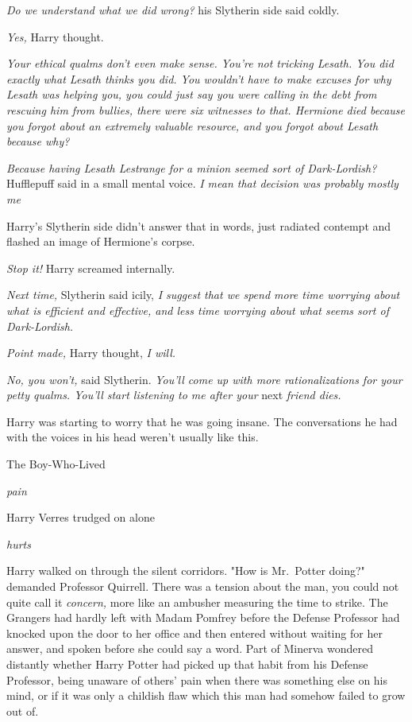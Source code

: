 \emph{Do we understand what we did wrong?} his Slytherin side said coldly.

\emph{Yes,} Harry thought.

\emph{Your ethical qualms don't even make sense. You're not tricking Lesath.
You did exactly what Lesath thinks you did. You wouldn't have to make excuses
for why Lesath was helping you, you could just say you were calling in the debt
from rescuing him from bullies, there were six witnesses to that. Hermione died
because you forgot about an extremely valuable resource, and you forgot about
Lesath because{\el} why?}

\emph{Because having Lesath Lestrange for a minion seemed sort of
Dark-Lordish?} Hufflepuff said in a small mental voice. \emph{I mean{\el}
that decision was probably mostly me{\el}}

Harry's Slytherin side didn't answer that in words, just radiated contempt and
flashed an image of Hermione's corpse.

\emph{Stop it!} Harry screamed internally.

\emph{Next time,} Slytherin said icily, \emph{I suggest that we spend more time
worrying about what is efficient and effective, and less time worrying about
what seems sort of Dark-Lordish.}

\emph{Point made,} Harry thought, \emph{I will.}

\emph{No, you won't,} said Slytherin. \emph{You'll come up with more
rationalizations for your petty qualms. You'll start listening to me after
your} next \emph{friend dies.}

Harry was starting to worry that he was going insane. The conversations he had
with the voices in his head weren't usually like this.

The Boy-Who-Lived

\emph{pain}

Harry Verres trudged on alone

\emph{hurts}

Harry walked on through the silent corridors.
\sbreak
"How is Mr.~Potter doing?" demanded Professor Quirrell. There was a tension
about the man, you could not quite call it \emph{concern,} more like an
ambusher measuring the time to strike. The Grangers had hardly left with Madam
Pomfrey before the Defense Professor had knocked upon the door to her office
and then entered without waiting for her answer, and spoken before she could
say a word. Part of Minerva wondered distantly whether Harry Potter had picked
up that habit from his Defense Professor, being unaware of others' pain when
there was something else on his mind, or if it was only a childish flaw which
this man had somehow failed to grow out of.

